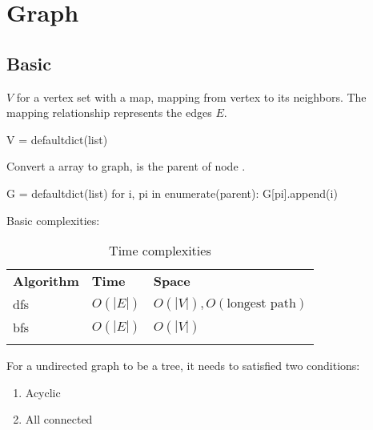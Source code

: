 \chapter{Graph}

\section{Basic}
 $V$ for a vertex set with a map, mapping from vertex to its neighbors. The mapping relationship represents the edges $E$.
\begin{python}
V = defaultdict(list)
\end{python}

Convert a  array to graph,  is the parent of node . 
\begin{python}
G = defaultdict(list)
for i, pi in enumerate(parent):
    G[pi].append(i)
\end{python}
 Basic complexities:

\begin{table}

\begin{tabular}{lll}
\hline\noalign{\smallskip}
\textbf{Algorithm} & \textbf{Time}  & \textbf{Space}\\
\noalign{\smallskip}\hline\noalign{\smallskip}
dfs & $O(|E|)$ & $O(|V|), O(\text{longest path})$ \\
bfs & $O(|E|)$ & $O(|V|)$ \\
\noalign{\smallskip}\hline\noalign{\smallskip}
\end{tabular}

\caption{Time complexities}
\end{table}

 For a undirected graph to be a tree, it needs to satisfied two conditions:
\begin{enumerate}
\item Acyclic
\item All connected
\end{enumerate}
